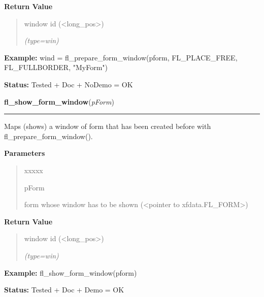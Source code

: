 \begin{boxedminipage}{\funcwidth}
      \textbf{Return Value}
    \vspace{-1ex}

      \begin{quote}
      window id ({\textless}long\_pos{\textgreater})

      {\it (type=win)}

      \end{quote}

\textbf{Example:} wind = fl\_prepare\_form\_window(pform, FL\_PLACE\_FREE, FL\_FULLBORDER, 
"MyForm")



\textbf{Status:} Tested + Doc + NoDemo = OK



    \end{boxedminipage}

    \label{xformslib:library:fl_show_form_window}

    \vspace{0.5ex}

\hspace{.8\funcindent}\begin{boxedminipage}{\funcwidth}

    \raggedright \textbf{fl\_show\_form\_window}(\textit{pForm})

    \vspace{-1.5ex}

    \rule{\textwidth}{0.5\fboxrule}
\setlength{\parskip}{2ex}
    Maps (shows) a window of form that has been created before with 
    fl\_prepare\_form\_window().

\setlength{\parskip}{1ex}
      \textbf{Parameters}
      \vspace{-1ex}

      \begin{quote}
        \begin{Ventry}{xxxxx}

          \item[pForm]

          form whose window has to be shown ({\textless}pointer to 
          xfdata.FL\_FORM{\textgreater})

        \end{Ventry}

      \end{quote}

      \textbf{Return Value}
    \vspace{-1ex}

      \begin{quote}
      window id ({\textless}long\_pos{\textgreater})

      {\it (type=win)}

      \end{quote}

\textbf{Example:} fl\_show\_form\_window(pform)



\textbf{Status:} Tested + Doc + Demo = OK



    \end{boxedminipage}


